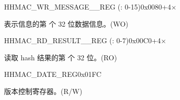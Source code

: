     \begin{register}{H}{HMAC\_WR\_MESSAGE\_\_REG (: 0-15)}{0x0080+4×}\label{regdesc:HMACWRMESSAGENREG}
    \regnewline%
    \begin{regdesc}\begin{reglist}
    \label{fielddesc:HMACWDATAN}\item [HMAC\_WDATA\_\regindex{n}] 表示信息的第  个 32 位数据信息。(WO)
    \end{reglist}\end{regdesc}
    \end{register}


    \begin{register}{H}{HMAC\_RD\_RESULT\_\_REG (: 0-7)}{0x00C0+4×}\label{regdesc:HMACRDRESULTNREG}
    \regnewline%
    \begin{regdesc}\begin{reglist}
    \label{fielddesc:HMACRDATAN}\item [HMAC\_RDATA\_\regindex{n}] 读取 hash 结果的第  个 32 位。(RO)
    \end{reglist}\end{regdesc}
    \end{register}

    \begin{register}{H}{HMAC\_DATE\_REG}{0x01FC}\label{regdesc:HMACDATEREG}
    \regnewline%
    \begin{regdesc}\begin{reglist}
    \label{fielddesc:HMACDATE}\item [HMAC\_DATE] 版本控制寄存器。(R/W)
    \end{reglist}\end{regdesc}
    \end{register}
